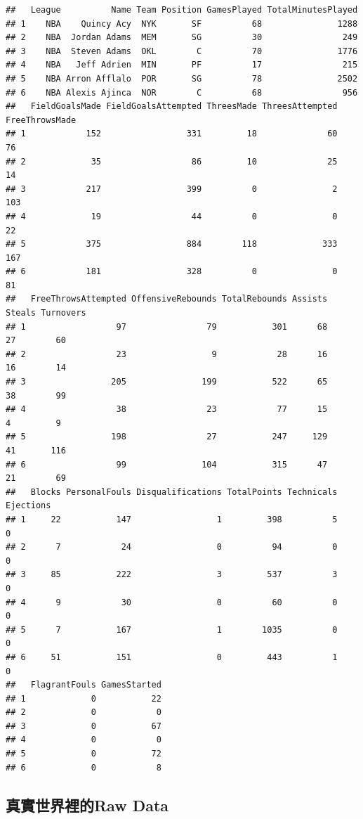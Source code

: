 \documentclass[]{book}
\theoremstyle{definition}
\theoremstyle{definition}
\theoremstyle{remark}
\begin{document}
\begin{verbatim}
##   League          Name Team Position GamesPlayed TotalMinutesPlayed
## 1    NBA    Quincy Acy  NYK       SF          68               1288
## 2    NBA  Jordan Adams  MEM       SG          30                249
## 3    NBA  Steven Adams  OKL        C          70               1776
## 4    NBA   Jeff Adrien  MIN       PF          17                215
## 5    NBA Arron Afflalo  POR       SG          78               2502
## 6    NBA Alexis Ajinca  NOR        C          68                956
##   FieldGoalsMade FieldGoalsAttempted ThreesMade ThreesAttempted FreeThrowsMade
## 1            152                 331         18              60             76
## 2             35                  86         10              25             14
## 3            217                 399          0               2            103
## 4             19                  44          0               0             22
## 5            375                 884        118             333            167
## 6            181                 328          0               0             81
##   FreeThrowsAttempted OffensiveRebounds TotalRebounds Assists Steals Turnovers
## 1                  97                79           301      68     27        60
## 2                  23                 9            28      16     16        14
## 3                 205               199           522      65     38        99
## 4                  38                23            77      15      4         9
## 5                 198                27           247     129     41       116
## 6                  99               104           315      47     21        69
##   Blocks PersonalFouls Disqualifications TotalPoints Technicals Ejections
## 1     22           147                 1         398          5         0
## 2      7            24                 0          94          0         0
## 3     85           222                 3         537          3         0
## 4      9            30                 0          60          0         0
## 5      7           167                 1        1035          0         0
## 6     51           151                 0         443          1         0
##   FlagrantFouls GamesStarted
## 1             0           22
## 2             0            0
## 3             0           67
## 4             0            0
## 5             0           72
## 6             0            8
\end{verbatim}

\subsection{真實世界裡的Raw Data}\label{raw-data}
\end{document}
